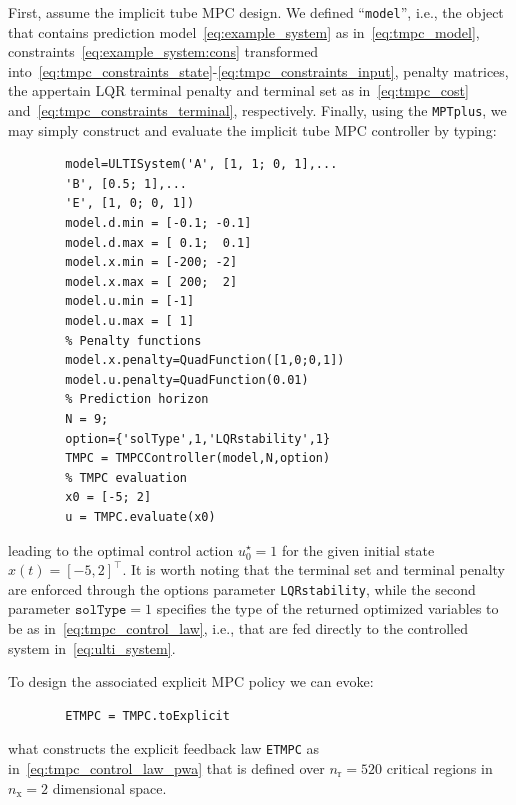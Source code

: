 \documentclass[letterpaper, 10 pt, conference]{ieeeconf}
\begin{document}
	First, assume the implicit tube MPC design. We defined ``\verb|model|'', i.e., the object that contains prediction model~\eqref{eq:example_system} as in~\eqref{eq:tmpc_model}, constraints~\eqref{eq:example_system:cons} transformed into~\eqref{eq:tmpc_constraints_state}-\eqref{eq:tmpc_constraints_input}, penalty matrices, the appertain LQR terminal penalty and terminal set as in~\eqref{eq:tmpc_cost} and~\eqref{eq:tmpc_constraints_terminal}, respectively. 
	Finally, using the \texttt{MPTplus}, we may simply construct and evaluate the implicit tube MPC controller by typing:
	\begin{verbatim}
		model=ULTISystem('A', [1, 1; 0, 1],...
		'B', [0.5; 1],...
		'E', [1, 0; 0, 1])
		model.d.min = [-0.1; -0.1] 
		model.d.max = [ 0.1;  0.1]
		model.x.min = [-200; -2]
		model.x.max = [ 200;  2]
		model.u.min = [-1]
		model.u.max = [ 1]
		% Penalty functions
		model.x.penalty=QuadFunction([1,0;0,1])
		model.u.penalty=QuadFunction(0.01)
		% Prediction horizon
		N = 9;
		option={'solType',1,'LQRstability',1}
		TMPC = TMPCController(model,N,option)
		% TMPC evaluation
		x0 = [-5; 2]
		u = TMPC.evaluate(x0)
	\end{verbatim}
	leading to the optimal control action $u_{0}^{\star} = 1$ for the given initial state $x(t) = [-5, 2]^\top$.
	It is worth noting that the terminal set and terminal penalty are enforced through the options parameter \texttt{LQRstability}, while the second parameter $\texttt{solType} = 1$ specifies the type of the returned optimized variables to be as in~\eqref{eq:tmpc_control_law}, i.e., that are fed directly to the controlled system in~\eqref{eq:ulti_system}.
	
	To design the associated explicit MPC policy we can evoke:
	\begin{verbatim}
		ETMPC = TMPC.toExplicit
	\end{verbatim}
	what constructs the explicit feedback law \verb|ETMPC| as in~\eqref{eq:tmpc_control_law_pwa} that is defined over $n_\text{r} = 520$ critical regions in $n_\text{x} = 2$ dimensional space.
	
	
	
\end{document}
